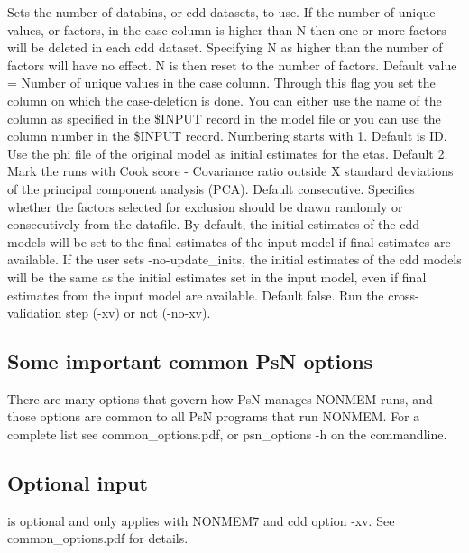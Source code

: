 \begin{optionlist}
Sets the number of databins, or cdd datasets, to use. If the number of unique values, or factors, in the case column is higher than N then 
one or more factors will be deleted in each cdd dataset. Specifying N as higher than the number of factors will have no effect. N is then 
reset to the number of factors. Default value = Number of unique values in the case column. 
\nextopt
{}
Through this flag you set the column on which the case-deletion is done. You can either use the name of the column as specified in the 
\mbox{\$INPUT} record in the model file or you can use the column number in the \mbox{\$INPUT} record. Numbering starts with 1. 
Default is ID.
\nextopt
{}
Use the phi file of the original model as initial estimates for the etas.
\nextopt
{}
Default 2. Mark the runs with Cook score - Covariance ratio outside X standard deviations of
the principal component analysis (PCA). 
\nextopt
{}
Default consecutive. Specifies whether the factors selected for exclusion should be drawn randomly or consecutively from the datafile. 
\nextopt
{}
By default, the initial estimates of the cdd models will be set to the final estimates of the input model if final
estimates are available. If the user sets -no-update\_inits, the initial estimates of the cdd models will be
the same as the initial estimates set in the input model, even if final estimates from the input model are available.
\nextopt
{}
Default false. Run the cross-validation step (-xv) or not (-no-xv). 
\nextopt
\end{optionlist}

\subsection{Some important common PsN options}
There are many options that govern how PsN manages NONMEM runs, and
those options are common to all PsN programs that run NONMEM.
For a complete list see common\_options.pdf, 
or psn\_options -h on the commandline.
\subsection{Optional input}

\begin{optionlist}
is optional and only applies with NONMEM7 and cdd option -xv. 
See common\_options.pdf for details.
\nextopt
\end{optionlist}

